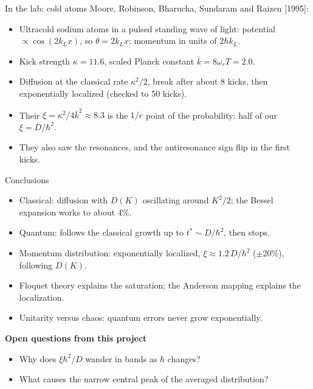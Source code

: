 \documentclass[aspectratio=169,10pt]{beamer}
\newcommand{\src}[1]{{\small\color{gray}[#1]}}
\begin{document}
\begin{frame}{In the lab: cold atoms}
  Moore, Robinson, Bharucha, Sundaram and Raizen \src{1995}:
  \begin{itemize}
    \item Ultracold sodium atoms in a pulsed standing wave of light: potential $\propto \cos(2k_L x)$,
    so $\theta = 2k_Lx$; momentum in units of $2\hbar k_L$.
    \item Kick strength $\kappa = 11.6$, scaled Planck constant $\bar k = 8\omega_rT = 2.0$.
    \item Diffusion at the classical rate $\kappa^2/2$, break after about 8 kicks, then exponentially
    localized (checked to 50 kicks).
    \item Their $\xi = \kappa^2/4\bar k^2 \approx 8.3$ is the $1/e$ point of the probability: half of our
    $\xi = D/\hbar^2$.
    \item They also saw the resonances, and the antiresonance sign flip in the first kicks.
  \end{itemize}
\end{frame}

\begin{frame}{Conclusions}
  \begin{itemize}
    \item Classical: diffusion with $D(K)$ oscillating around $K^2/2$; the Bessel expansion works to
    about 4\%.
    \item Quantum: follows the classical growth up to $t^* \sim D/\hbar^2$, then stops.
    \item Momentum distribution: exponentially localized, $\xi \approx 1.2\,D/\hbar^2$ ($\pm20\%$), following
    $D(K)$.
    \item Floquet theory explains the saturation; the Anderson mapping explains the localization.
    \item Unitarity versus chaos: quantum errors never grow exponentially.
  \end{itemize}
  \textbf{Open questions from this project}
  \begin{itemize}
    \item Why does $\xi\hbar^2/D$ wander in bands as $\hbar$ changes?
    \item What causes the narrow central peak of the averaged distribution?
  \end{itemize}
\end{frame}
\end{document}
